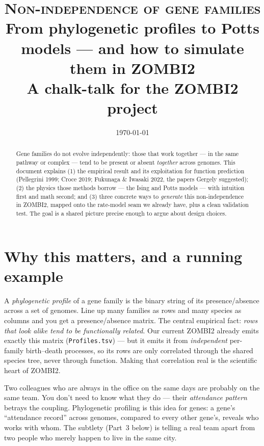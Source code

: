 \documentclass[11pt, oneside]{article}
\title{\vspace{-1.4cm}
  {\Large \textcolor{mainblue}{\textsc{Non-independence of gene families}}}\\[0.3em]
  {\large From phylogenetic profiles to Potts models --- and how to simulate them in ZOMBI2}\\[0.4em]
  {\normalsize A chalk-talk for the ZOMBI2 project}}
\author{}
\date{\today}
\begin{document}
\maketitle
\thispagestyle{fancy}
\vspace{-0.8cm}

\begin{abstract}\noindent
Gene families do not evolve independently: those that work together --- in the same pathway
or complex --- tend to be present or absent \emph{together} across genomes. This document
explains (1) the empirical result and its exploitation for function prediction (Pellegrini
1999; Croce 2019; Fukunaga \& Iwasaki 2022, the papers Gergely suggested); (2) the physics
those methods borrow --- the Ising and Potts models --- with intuition first and math second;
and (3) three concrete ways to \emph{generate} this non-independence in ZOMBI2, mapped onto
the rate-model seam we already have, plus a clean validation test. The goal is a shared
picture precise enough to argue about design choices.
\end{abstract}

\section{Why this matters, and a running example}

A \emph{phylogenetic profile} of a gene family is the binary string of its
presence/absence across a set of genomes. Line up many families as rows and many species as
columns and you get a presence/absence matrix. The central empirical fact: \emph{rows that
look alike tend to be functionally related}. Our current ZOMBI2 already emits exactly this
matrix (\texttt{Profiles.tsv}) --- but it emits it from \emph{independent} per-family
birth--death processes, so its rows are only correlated through the shared species tree, never
through function. Making that correlation real is the scientific heart of ZOMBI2.

\begin{intuitionbox}
Two colleagues who are always in the office on the same days are probably on the same team.
You don't need to know what they do --- their \emph{attendance pattern} betrays the coupling.
Phylogenetic profiling is this idea for genes: a gene's ``attendance record'' across genomes,
compared to every other gene's, reveals who works with whom. The subtlety (Part~3 below) is
telling a real team apart from two people who merely happen to live in the same city.
\end{intuitionbox}
\end{document}
